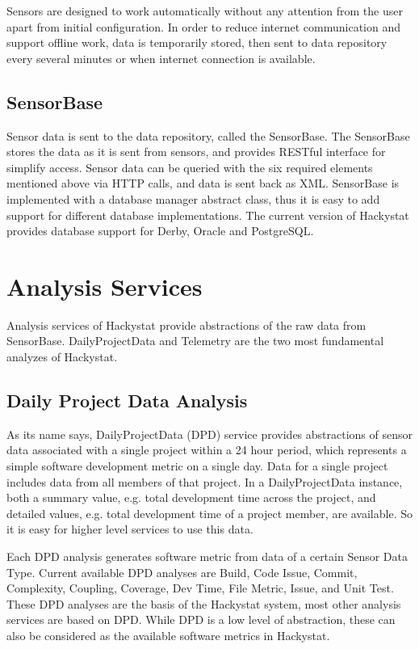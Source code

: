 Sensors are designed to work automatically without any attention from the user apart from initial configuration. In order to reduce internet communication and support offline work, data is temporarily stored, then sent to data repository every several minutes or when internet connection is available.

\subsection{SensorBase}
Sensor data is sent to the data repository, called the SensorBase. The SensorBase stores the data as it is sent from sensors, and provides RESTful interface for simplify access. Sensor data can be queried with the six required elements mentioned above via HTTP calls, and data is sent back as XML. SensorBase is implemented with a database manager abstract class, thus it is easy to add support for different database implementations. The current version of Hackystat provides database support for Derby, Oracle and PostgreSQL.

\section{Analysis Services}
Analysis services of Hackystat provide abstractions of the raw data from SensorBase. DailyProjectData and Telemetry are the two most fundamental analyzes of Hackystat.

\subsection{Daily Project Data Analysis}
As its name says, DailyProjectData (DPD) service provides abstractions of sensor data associated with a single project within a 24 hour period, which represents a simple software development metric on a single day. Data for a single project includes data from all members of that project. In a DailyProjectData instance, both a summary value, e.g. total development time across the project, and detailed values, e.g. total development time of a project member, are available. So it is easy for higher level services to use this data.

Each DPD analysis generates software metric from data of a certain Sensor Data Type. Current available DPD analyses are Build, Code Issue, Commit, Complexity, Coupling, Coverage, Dev Time, File Metric, Issue, and Unit Test. These DPD analyses are the basis of the Hackystat system, most other analysis services are based on DPD. While DPD is a low level of abstraction, these can also be considered as the available software metrics in Hackystat.


